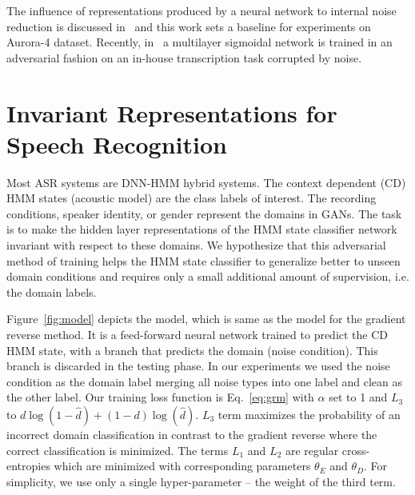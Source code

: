 \documentclass{article}
\begin{document}

The influence of representations produced by a neural network to internal noise reduction is discussed in~\cite{yu2013feature} and this work sets a baseline for experiments on  Aurora-4 dataset. Recently, in~\cite{yusuke2016adversarial} a multilayer sigmoidal network is trained in an adversarial fashion on an in-house transcription task corrupted by noise.
\section{Invariant Representations for Speech Recognition}
\label{sec:invariant-speech}

Most ASR systems are DNN-HMM hybrid systems. The context dependent (CD) HMM states (acoustic model) are the class labels of interest. The
recording conditions, speaker identity, or gender represent the domains in GANs. The task is to make the hidden layer representations of the HMM state classifier network 
invariant with respect to these domains. We hypothesize that this adversarial method of
training helps the HMM state classifier to generalize better to unseen domain conditions and requires only a  
small additional amount of supervision, i.e. the domain labels.  

Figure~\ref{fig:model} depicts the model, which is same as the model for the gradient reverse method. It is a feed-forward neural network trained to predict the CD HMM state, with a branch that predicts the domain (noise condition). This branch is discarded in the testing phase. In our experiments we
used the noise condition as the domain label merging all noise types into one label
and clean as the other label. Our training loss function is  Eq.~\ref{eq:grm} with $\alpha$ set to 1 and
$L_3$ to $d\log(1 - \hat{d}) + (1-d)\log(\hat{d})$. $L_3$ term maximizes the probability
of an incorrect domain classification in contrast to the gradient reverse where the 
correct classification is minimized.
The terms $L_1$ and $L_2$ are 
regular cross-entropies which are minimized with corresponding parameters $\theta_E$ and $\theta_D$.
For simplicity, we use only a single hyper-parameter -- the weight of the third term.
 
\end{document}
